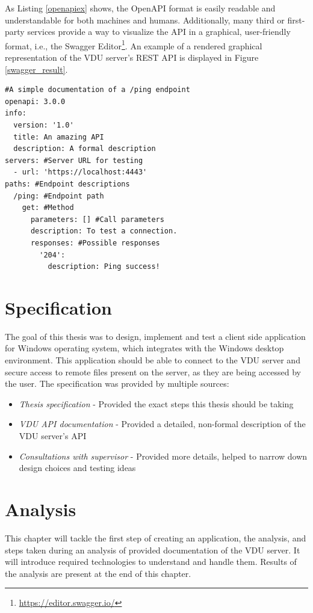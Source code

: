 As Listing \ref{openapiex} shows, the OpenAPI format is easily readable and understandable for both machines and humans. Additionally, many third or first-party services provide a way to visualize the API in a graphical, user-friendly format, i.e., the Swagger Editor\footnote{\url{https://editor.swagger.io/}}. An example of a rendered graphical representation of the VDU server's REST API is displayed in Figure \ref{swagger_result}.
\begin{lstlisting}[caption={An example of an OpenAPI file in the YAML format}, label=openapiex]
#A simple documentation of a /ping endpoint
openapi: 3.0.0 
info:
  version: '1.0' 
  title: An amazing API
  description: A formal description
servers: #Server URL for testing
  - url: 'https://localhost:4443'
paths: #Endpoint descriptions
  /ping: #Endpoint path
    get: #Method
      parameters: [] #Call parameters
      description: To test a connection.
      responses: #Possible responses
        '204':
          description: Ping success!
\end{lstlisting}
\chapter{Specification}
\label{ch_specification}
The goal of this thesis was to design, implement and test a client side application for Windows operating system, which integrates with the Windows desktop environment. This application should be able to connect to the VDU server and secure access to remote files present on the server, as they are being accessed by the user. The specification was provided by multiple sources:
\begin{itemize}
    \item \textit{Thesis specification} - Provided the exact steps this thesis should be taking
    \item \textit{VDU API documentation} - Provided a detailed, non-formal description of the VDU server's API
    \item \textit{Consultations with supervisor} - Provided more details, helped to narrow down design choices and testing ideas
\end{itemize}

\chapter{Analysis}
\label{ch_analysis}
This chapter will tackle the first step of creating an application, the analysis, and steps taken during an analysis of provided documentation of the VDU server. It will introduce required technologies to understand and handle them. Results of the analysis are present at the end of this chapter.

